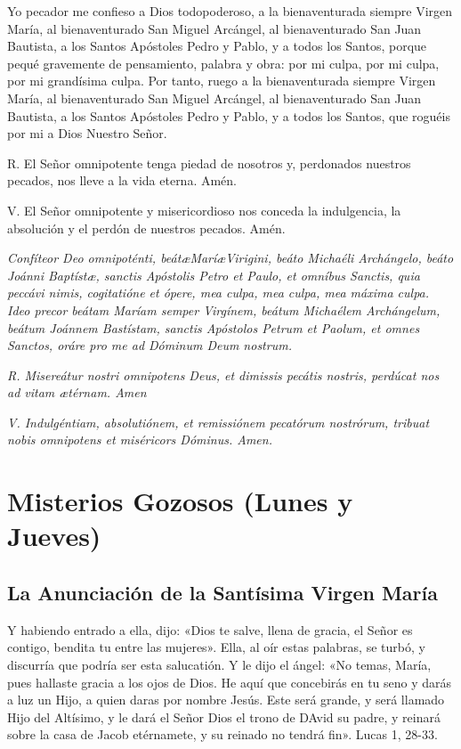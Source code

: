 \documentclass[a4paper,11pt, oneside]{report}
\begin{document}
    Yo pecador me confieso a Dios todopoderoso, a la bienaventurada siempre Virgen María, al bienaventurado San Miguel Arcángel,
    al bienaventurado San Juan Bautista, a los Santos Apóstoles Pedro y Pablo, y a todos los Santos, porque pequé gravemente de 
    pensamiento, palabra y obra: por mi culpa, por mi culpa, por mi grandísima culpa. Por tanto, ruego a la bienaventurada siempre
    Virgen María, al bienaventurado San Miguel Arcángel, al bienaventurado San Juan Bautista, a los Santos Apóstoles Pedro y Pablo,
    y a todos los Santos, que roguéis por mi a Dios Nuestro Señor.\par\smallbreak{}
    R. El Señor omnipotente tenga piedad de nosotros y, perdonados nuestros pecados, nos lleve a la vida eterna. Amén.\par\smallbreak{}
    V. El Señor omnipotente y misericordioso nos conceda la indulgencia, la absolución y el perdón de nuestros pecados. Amén.

    \medskip

    \textit{Confíteor Deo omnipoténti, beát\ae Marí\ae Virigini, beáto Michaéli Archángelo, beáto Joánni Baptíst\ae, sanctis Apóstolis
    Petro et Paulo, et omníbus Sanctis, quia peccávi nimis, cogitatióne et ópere, mea culpa, mea culpa, mea máxima culpa. Ideo precor
    beátam Maríam semper Virgínem, beátum Michaélem Archángelum, beátum Joánnem Bastístam, sanctis Apóstolos Petrum et Paolum, et omnes
    Sanctos, oráre pro me ad Dóminum Deum nostrum.}\par\smallbreak{}
    \textit{R. Misereátur nostri omnipotens Deus, et dimissis pecátis nostris, perdúcat nos ad vitam {\ae}térnam. Amen}\par\smallbreak{}
    \textit{V. Indulgéntiam, absolutiónem, et remissiónem pecatórum nostrórum, tribuat nobis omnipotens et miséricors Dóminus. Amen.}
    


  \section*{Misterios Gozosos (Lunes y Jueves)}
    
    \subsection*{La Anunciación de la Santísima Virgen María}
      Y habiendo entrado a ella, dijo: «Dios te salve, llena de gracia, el Señor es contigo, bendita tu entre las mujeres». Ella, al oír estas palabras, se turbó,
      y discurría que podría ser esta salucatión. Y le dijo el ángel: «No temas, María, pues hallaste gracia a los ojos de Dios. He aquí que concebirás en tu seno
      y darás a luz un Hijo, a quien daras por nombre Jesús. Este será grande, y será llamado Hijo del Altísimo, y le dará el Señor Dios el trono de DAvid su padre,
      y reinará sobre la casa de Jacob etérnamete, y su reinado no tendrá fin». Lucas 1, 28-33.
      
\end{document}
